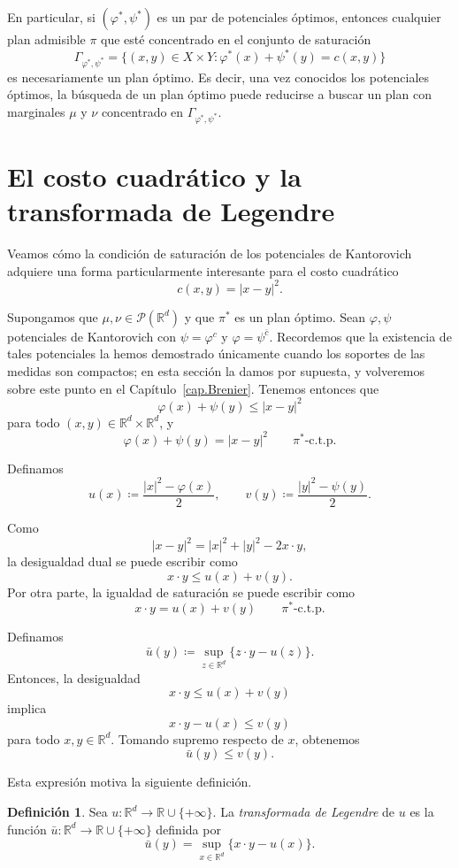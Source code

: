 \documentclass[12pt, a4paper]{amsbook}
\theoremstyle{remark}
\theoremstyle{definition}
\newtheorem{defi}[teo]{Definición}
\numberwithin{section}{chapter}
\numberwithin{subsection}{section}
\numberwithin{equation}{section}
\numberwithin{figure}{chapter}
\begin{document}
En particular, si $(\varphi^*,\psi^*)$ es un par de potenciales óptimos,
entonces cualquier plan admisible $\pi$ que esté concentrado en el conjunto
de saturación
\[
\Gamma_{\varphi^*,\psi^*}
=
\bigl\{
(x,y)\in X\times Y:
\varphi^*(x)+\psi^*(y)=c(x,y)
\bigr\}
\]
es necesariamente un plan óptimo. Es decir, una vez conocidos los
potenciales óptimos, la búsqueda de un plan óptimo puede reducirse a
buscar un plan con marginales $\mu$ y $\nu$ concentrado en
$\Gamma_{\varphi^*,\psi^*}$.

\section{El costo cuadrático y la transformada de Legendre}\label{sec.costo.cuadratico}

Veamos cómo la condición de saturación de los potenciales de Kantorovich
adquiere una forma particularmente interesante para el costo cuadrático
\[
c(x,y)=|x-y|^2.
\]

Supongamos que $\mu,\nu\in\mathcal P(\mathbb R^d)$ y que $\pi^*$ es un
plan óptimo. Sean $\varphi,\psi$ potenciales de Kantorovich con
$\psi=\varphi^c$ y $\varphi=\psi^{\bar c}$. Recordemos que la existencia de
tales potenciales la hemos demostrado únicamente cuando los soportes de las
medidas son compactos; en esta sección la damos por supuesta, y volveremos
sobre este punto en el Capítulo~\ref{cap.Brenier}. Tenemos entonces que
\[
\varphi(x)+\psi(y)\leq |x-y|^2
\]
para todo $(x,y)\in\mathbb R^d\times\mathbb R^d$, y
\[
\varphi(x)+\psi(y)=|x-y|^2
\qquad \pi^*\text{-c.t.p.}
\]

Definamos
\[
u(x)\coloneqq\frac{|x|^2-\varphi(x)}{2},
\qquad
v(y)\coloneqq\frac{|y|^2-\psi(y)}{2}.
\]

Como
\[
|x-y|^2=|x|^2+|y|^2-2x\cdot y,
\]
la desigualdad dual se puede escribir como
\[
x\cdot y\leq u(x)+v(y).
\]
Por otra parte, la igualdad de saturación se puede escribir como
\[
x\cdot y=u(x)+v(y)
\qquad \pi^*\text{-c.t.p.}
\]

Definamos
\[
\bar u(y)\coloneqq
\sup_{z\in\mathbb R^d}
\{z\cdot y-u(z)\}.
\]
Entonces, la desigualdad
\[
x\cdot y\leq u(x)+v(y)
\]
implica
\[
x\cdot y-u(x)\leq v(y)
\]
para todo $x,y\in\mathbb R^d$. Tomando supremo respecto de $x$, obtenemos
\[
\bar u(y)\leq v(y).
\]

Esta expresión motiva la siguiente definición.

\begin{defi}
Sea $u\colon\mathbb R^d\to\mathbb R\cup\{+\infty\}$. La \emph{transformada
de Legendre} de $u$ es la función $\bar u\colon\mathbb R^d\to
\mathbb R\cup\{+\infty\}$ definida por
\[
\bar u(y)
=
\sup_{x\in\mathbb R^d}
\bigl\{
x\cdot y-u(x)
\bigr\}.
\]
\end{defi}
\end{document}

